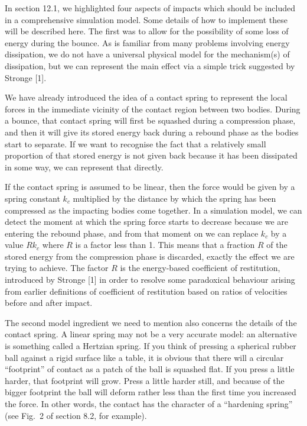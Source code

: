   In section 12.1, we highlighted four aspects of impacts which should be 
  included in a comprehensive simulation model. Some details of how to 
  implement these will be described here. The first was to allow for the 
  possibility of some loss of energy during the bounce. As is familiar from 
  many problems involving energy dissipation, we do not have a universal 
  physical model for the mechanism(s) of dissipation, but we can represent the 
  main effect via a simple trick suggested by Stronge [1]. 

  We have already introduced the idea of a contact spring to represent the 
  local forces in the immediate vicinity of the contact region between two 
  bodies. During a bounce, that contact spring will first be squashed during a 
  compression phase, and then it will give its stored energy back during a 
  rebound phase as the bodies start to separate. If we want to recognise the 
  fact that a relatively small proportion of that stored energy is not given 
  back because it has been dissipated in some way, we can represent that 
  directly. 

  If the contact spring is assumed to be linear, then the force would be given 
  by a spring constant $k_c$ multiplied by the distance by which the spring has 
  been compressed as the impacting bodies come together. In a simulation model, 
  we can detect the moment at which the spring force starts to decrease because 
  we are entering the rebound phase, and from that moment on we can replace 
  $k_c$ by a value $Rk_c$ where $R$ is a factor less than 1. This means that a 
  fraction $R$ of the stored energy from the compression phase is discarded, 
  exactly the effect we are trying to achieve. The factor $R$ is the 
  energy-based coefficient of restitution, introduced by Stronge [1] in order 
  to resolve some paradoxical behaviour arising from earlier definitions of 
  coefficient of restitution based on ratios of velocities before and after 
  impact. 

  The second model ingredient we need to mention also concerns the details of 
  the contact spring. A linear spring may not be a very accurate model: an 
  alternative is something called a Hertzian spring. If you think of pressing a 
  spherical rubber ball against a rigid surface like a table, it is obvious 
  that there will a circular ``footprint'' of contact as a patch of the ball is 
  squashed flat. If you press a little harder, that footprint will grow. Press 
  a little harder still, and because of the bigger footprint the ball will 
  deform rather less than the first time you increased the force. In other 
  words, the contact has the character of a ``hardening spring'' (see Fig.\ 2 
  of section 8.2, for example). 

